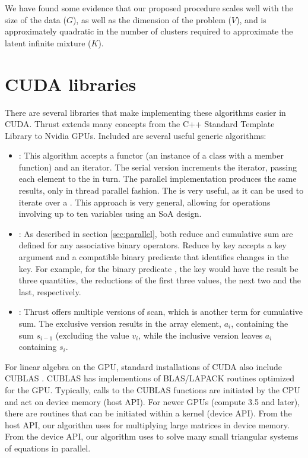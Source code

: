 {We have found some evidence that our proposed procedure scales well with the size of the data ($G$), as well as the dimension of the problem ($V$), and is approximately quadratic in the number of clusters required to approximate the latent infinite mixture ($K$).

\appendix
\section{CUDA libraries}
There are several libraries that make implementing these algorithms easier in CUDA. Thrust \citep{thrust} extends many concepts from the C++ Standard Template Library to Nvidia GPUs. Included are several useful generic algorithms:
\begin{itemize}
\item {}: This algorithm accepts a functor (an
  instance of a class with a member  function)
  and an iterator. The serial version increments the iterator, passing
  each element to the  in turn. The parallel implementation
  produces the same results, only in thread parallel fashion. The
   is very useful, as it can be used
  to iterate
  over a . This approach is very general, allowing
  for operations involving up to ten variables using an SoA
  design.

\item {}: As described in section
  \ref{sec:parallel}, both reduce and cumulative sum are defined for any associative binary operators. Reduce by key accepts a key argument and a compatible binary predicate that identifies changes in the key. For example, for the binary predicate , the key  would have the result be three quantities, the reductions of the first three values, the next two and the last, respectively.

\item {}: Thrust
  offers multiple versions of scan, which is another term for cumulative sum. The exclusive
  version results in the array element, $a_i$, containing the sum $s_{i-1}$ (excluding the value $v_i$, while the inclusive version leaves $a_i$ containing $s_i$.
\end{itemize}

For linear algebra on the GPU, standard installations of CUDA also
include CUBLAS \cite{cublas}. CUBLAS has implementions of BLAS/LAPACK
routines optimized for the GPU. Typically, calls to the CUBLAS
functions are initiated by the CPU and act on device memory (host
API). For newer GPUs (compute 3.5 and later), there are routines that
can be initiated within a kernel (device API). From the host API, our
algorithm uses  for multiplying large matrices in
device memory. From the
device API, our algorithm uses  to solve many small triangular
systems of equations in parallel.

}
